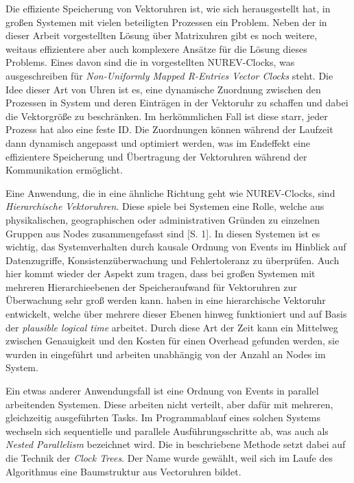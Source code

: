 Die effiziente Speicherung von Vektoruhren ist, wie sich herausgestellt hat, in großen Systemen mit vielen beteiligten Prozessen ein Problem. Neben der in dieser Arbeit vorgestellten Lösung über Matrixuhren gibt es noch weitere, weitaus effizientere aber auch komplexere Ansätze für die Lösung dieses Problems. Eines davon sind die in \cite{Gidenstam2004} vorgestellten NUREV-Clocks, was ausgeschreiben für \textit{Non-Uniformly Mapped R-Entries Vector Clocks} steht. Die Idee dieser Art von Uhren ist es, eine dynamische Zuordnung zwischen den Prozessen in System und deren Einträgen in der Vektoruhr zu schaffen und dabei die Vektorgröße zu beschränken. Im herkömmlichen Fall ist diese starr, jeder Prozess hat also eine feste ID. Die Zuordnungen können während der Laufzeit dann dynamisch angepasst und optimiert werden, was im Endeffekt eine effizientere Speicherung und Übertragung der Vektoruhren während der Kommunikation ermöglicht.

Eine Anwendung, die in eine ähnliche Richtung geht wie NUREV-Clocks, sind \textit{Hierarchische Vektoruhren}. Diese spiele bei Systemen eine Rolle, welche aus physikalischen, geographischen oder administrativen Gründen zu einzelnen Gruppen aus Nodes zusammengefasst sind \cite{Khotimsky1999}[S. 1]. In diesen Systemen ist es wichtig, das Systemverhalten durch kausale Ordnung von Events im Hinblick auf Datenzugriffe, Konsistenzüberwachung und Fehlertoleranz zu überprüfen. Auch hier kommt wieder der Aspekt zum tragen, dass bei großen Systemen mit mehreren Hierarchieebenen der Speicheraufwand für Vektoruhren zur Überwachung sehr groß werden kann.  haben in  \cite{Khotimsky1999} eine hierarchische Vektoruhr entwickelt, welche über mehrere dieser Ebenen hinweg funktioniert und auf Basis der \textit{plausible logical time} arbeitet. Durch diese Art der Zeit kann ein Mittelweg zwischen Genauigkeit und den Kosten für einen Overhead gefunden werden, sie wurden in \cite{Torres-Rojas1999} eingeführt und arbeiten unabhängig von der Anzahl an Nodes im System.

Ein etwas anderer Anwendungsfall ist eine Ordnung von Events in parallel arbeitenden Systemen. Diese arbeiten nicht verteilt, aber dafür mit mehreren, gleichzeitig ausgeführten Tasks. Im Programmablauf eines solchen Systems wechseln sich sequentielle und parallele Ausführungsschritte ab, was auch als \textit{Nested Parallelism} bezeichnet wird. Die in \cite{Audenaert1997} beschriebene Methode setzt dabei auf die Technik der \textit{Clock Trees}. Der Name wurde gewählt, weil sich im Laufe des Algorithmus eine Baumstruktur aus Vectoruhren bildet.


